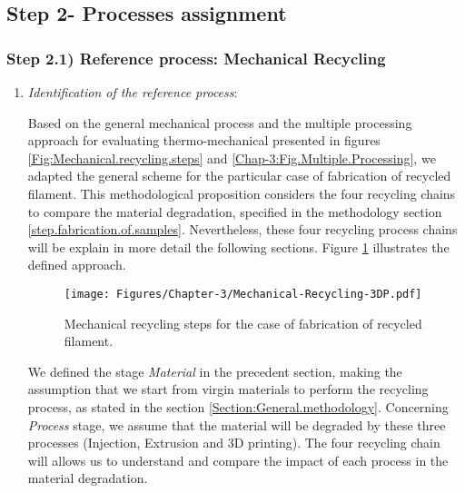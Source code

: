 


\subsection{Step 2- Processes assignment}
\subsubsection{Step 2.1) Reference process: Mechanical Recycling} 
\label{Sub:Reference.process}


\begin{enumerate}[leftmargin=0in, label=\emph{\alph*}.]
	
	\item  \textit{Identification of the reference process}:

Based on the general mechanical process and the multiple processing approach for evaluating thermo-mechanical presented in figures \ref{Fig:Mechanical.recycling.steps} and \ref{Chap-3:Fig.Multiple.Processing},
we adapted the general scheme for the particular case of fabrication of recycled filament. 
This methodological proposition considers the four recycling chains to compare the material degradation, specified in the methodology section \ref{step.fabrication.of.samples}.
Nevertheless, these four recycling process chains will be explain in more detail the following sections.
Figure \ref{Fig:Mechanical.Recycling.3DP} illustrates the defined approach.
	
	\begin{figure}[H]
		\centering
		\texttt{[image: Figures/Chapter-3/Mechanical-Recycling-3DP.pdf]}
		\caption{Mechanical recycling steps for the case of fabrication of recycled filament. }
		\label{Fig:Mechanical.Recycling.3DP}
	\end{figure}
	
	
We defined the stage \textit{Material} in the precedent section, making the assumption that we start from virgin materials to perform the recycling process, as stated in the section \ref{Section:General.methodology}.
%
Concerning \textit{Process} stage, we assume that the material will be degraded by these three processes (Injection, Extrusion and 3D printing).
The four recycling chain will allows us to understand and compare the impact of each process in the material degradation.


\end{enumerate}

